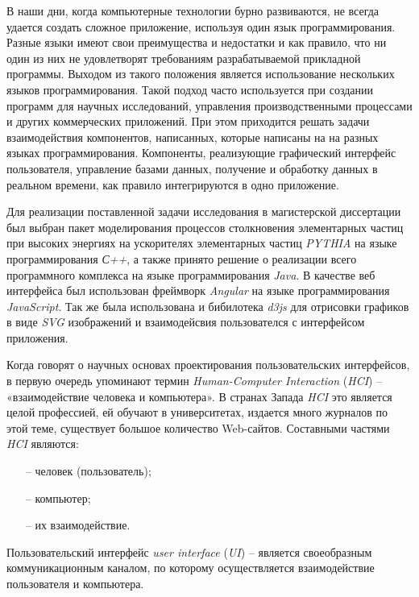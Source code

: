 В наши дни, когда компьютерные технологии бурно развиваются, не
всегда удается создать сложное приложение, используя один язык
программирования. Разные языки имеют свои преимущества и недостатки и как
правило, что ни один из них не удовлетворят требованиям разрабатываемой
прикладной программы. Выходом из такого положения является использование
нескольких языков программирования. Такой подход часто используется при
создании программ для научных исследований, управления производственными
процессами и других коммерческих приложений. При этом приходится решать
задачи взаимодействия компонентов, написанных, которые написаны на на
разных языках программирования. Компоненты, реализующие графический
интерфейс пользователя, управление базами данных, получение и обработку
данных в реальном времени, как правило интегрируются в одно приложение.

Для реализации поставленной задачи исследования в магистерской
диссертации был выбран пакет моделирования процессов столкновения элементарных частиц при высоких энергиях на ускорителях элементарных частиц \textit{PYTHIA} на языке программирования \textit{С++}, а также принято решение о реализации всего программного
комплекса на языке программирования \textit{Java}.
В качестве веб интерфейса был использован фреймворк \textit{Angular} на языке программирования \textit{JavaScript}. Так же была использована и бибилотека \textit{d3js} для отрисовки графиков в виде \textit{SVG} изображений и взаимодейсвия пользователся с интерфейсом приложения.

Когда говорят о научных основах проектирования пользовательских
интерфейсов, в первую очередь упоминают термин \textit{Human-Computer Interaction}
(\textit{HCI}) – «взаимодействие человека и компьютера». В странах Запада \textit{HCI} это
является целой профессией, ей обучают в университетах, издается много
журналов по этой теме, существует большое количество Web-сайтов.
Составными частями \textit{HCI} являются:

\begin{enumerate}
	\item[--] человек (пользователь);
	\item[--] компьютер;
	\item[--] их взаимодействие.
\end{enumerate}

Пользовательский интерфейс \textit{user interface} (\textit{UI}) – является своеобразным
коммуникационным каналом, по которому осуществляется взаимодействие
пользователя и компьютера.

